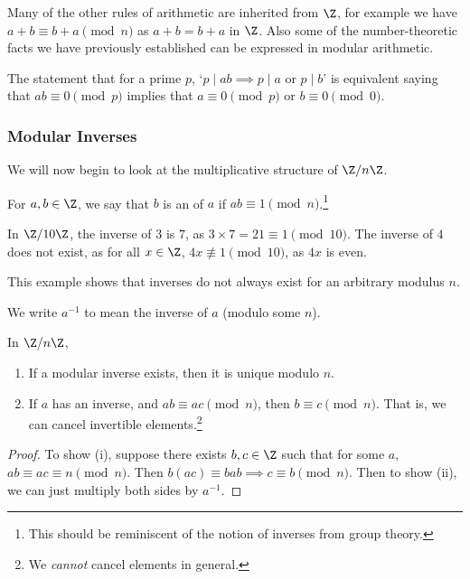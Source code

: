 Many of the other rules of arithmetic are inherited from $\Z$, for example we have $a + b \equiv b+a \pmod{n}$ as $a + b = b + a$ in $\Z$. Also some of the number-theoretic facts we have previously established can be expressed in modular arithmetic.

\begin{example}
	The statement that for a prime $p$, `$p \mid ab \implies p \mid a$ or $p \mid b$' is equivalent saying that $ab \equiv 0 \pmod{p}$ implies that $a \equiv 0 \pmod{p}$ or $b \equiv 0 \pmod{0}$.
\end{example}

\subsubsection{Modular Inverses}

We will now begin to look at the multiplicative structure of $\Z/n\Z$. 

\begin{definition}
	For $a, b \in \Z$, we say that $b$ is an  of $a$ if $ab \equiv 1 \pmod{n}$.\footnote{This should be reminiscent of the notion of inverses from group theory.}
\end{definition}

\begin{example}
	In $\Z/10\Z$, the inverse of $3$ is $7$, as $3\times 7 = 21\equiv 1 \pmod{10}$. The inverse of $4$ does not exist, as for all $x \in \Z$, $4x \not\equiv 1 \pmod{10}$, as $4x$ is even.

	This example shows that inverses do not always exist for an arbitrary modulus $n$.
\end{example}

\begin{notation}
	We write $a^{-1}$ to mean the inverse of $a$ (modulo some $n$).
\end{notation}

\begin{proposition}
	In $\Z/n\Z$,
	\begin{enumerate}[label=(\roman*)]
		\item If a modular inverse exists, then it is unique modulo $n$.
		\item If $a$ has an inverse, and $ab \equiv ac \pmod{n}$, then $b \equiv c \pmod{n}$. That is, we can cancel invertible elements.\footnote{We \emph{cannot} cancel elements in general.}
	\end{enumerate}
\end{proposition}
\begin{proof}
	To show (i),
	suppose there exists $b, c \in \Z$ such that for some $a$, $ab \equiv ac \equiv n \pmod{n}$. Then $b(ac) \equiv bab \implies c \equiv b \pmod{n}$. Then to show (ii), we can just multiply both sides by $a^{-1}$.
\end{proof}

